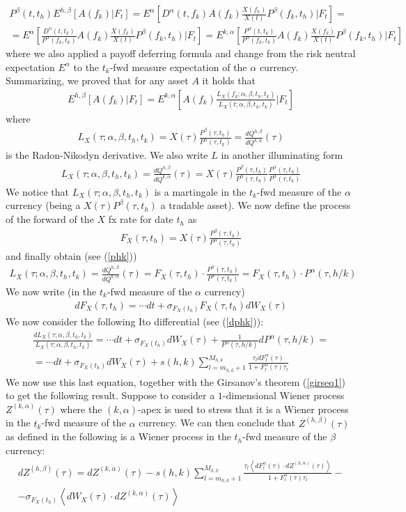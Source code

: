 \documentclass[a4paper,10pt]{report}
\theoremstyle{plain}
\theoremstyle{definition}
\newcommand\be{\begin{eqnarray}}    %
\newcommand\ee{\end{eqnarray}}
\begin{document}
\be 
P^{\beta}(t,t_h) E^{h, \beta}\left[A(f_k)| F_t\right] = E^{\alpha}\left[D^{\alpha}(t,f_k) A(f_k)  \frac{X(f_k)}{X(t)}  P^{\beta}(f_k,t_h) | F_t\right]=\\
=  E^{\alpha}\left[\frac{D^{\alpha}(t,t_k)}{P^{\alpha}(f_k,t_k)} A(f_k)  \frac{X(f_k)}{X(t)}  P^{\beta}(f_k,t_h) | F_t\right]
=E^{k, \alpha}\left[\frac{P^{\alpha}(t,t_k)}{P^{\alpha}(f_k,t_k)} A(f_k)  \frac{X(f_k)}{X(t)}  P^{\beta}(f_k,t_h) | F_t\right]
\ee
where we also applied a payoff deferring formula and change from the risk neutral expectation $E^{\alpha}$ to the $t_k$-fwd measure expectation of the $\alpha$ currency.
Summarizing, we proved that for any asset $A$ it holds that
\be 
E^{h, \beta}\left[A(f_k)| F_t\right] = E^{k, \alpha}\left[A(f_k) \frac{L_X (f_k; \alpha, \beta, t_h, t_k)}{L_X (t; \alpha, \beta, t_h, t_k)}| F_t\right]
\ee
where
\be 
L_X (\tau; \alpha, \beta, t_h, t_k) = X(\tau)\frac{P^{\beta}(\tau,t_h)}{P^{\alpha}(\tau,t_k)}=\frac{dQ^{h, \beta}}{dQ^{k, \alpha}}(\tau)
\ee
is the Radon-Nikodyn derivative.
We also write $L$ in another illuminating form
\be 
L_X (\tau; \alpha, \beta, t_h, t_k) =\frac{dQ^{h, \beta}}{dQ^{k, \alpha}}(\tau)=
X(\tau)\frac{P^{\beta}(\tau,t_h)}{P^{\alpha}(\tau,t_h)}\frac{P^{\alpha}(\tau,t_h)}{P^{\alpha}(\tau,t_k)}
\ee
We notice that $L_X (\tau; \alpha, \beta, t_h, t_k)$ is a martingale in the $t_k$-fwd measure of the $\alpha$ currency (being a $X(\tau)P^{\beta}(\tau,t_h)$ a tradable asset).
We now define the process of the forward of the $X$ fx rate for date $t_h$ as
\be 
F_X(\tau, t_h)=X(\tau)\frac{P^{\beta}(\tau,t_h)}{P^{\alpha}(\tau,t_h)}
\ee
and finally obtain (see (\ref{phk}))
\be 
L_X (\tau; \alpha, \beta, t_h, t_k) =\frac{dQ^{h, \beta}}{dQ^{k, \alpha}}(\tau)=
F_X(\tau, t_h)\cdot\frac{P^{\alpha}(\tau,t_h)}{P^{\alpha}(\tau,t_k)}=F_X(\tau, t_h)\cdot P^{\alpha}(\tau, h/k)
\label{chengecurrencyandtfwdradnyk}
\ee
We now write (in the $t_k$-fwd measure of the $\alpha$ currency)
\be 
d F_X(\tau, t_h) = \cdots dt +\sigma_{F_X(t_h)}  F_X(\tau, t_h)  dW_X(\tau)
\ee
We now consider the following Ito differential (see (\ref{dphk})):
\be 
\frac{d L_X (\tau; \alpha, \beta, t_h, t_k)}{ L_X (\tau; \alpha, \beta, t_h, t_k)}=\cdots dt+ \sigma_{F_X(t_h)}dW_X(\tau) + \frac{1}{P^{\alpha}(\tau, h/k)}d P^{\alpha}(\tau, h/k)=\\
= \cdots dt+ \sigma_{F_X(t_h)}dW_X(\tau) +s(h,k) \sum_{l=m_{h,k}+1}^{M_{h,k}} \frac{\tau_l  d F_l^{\alpha}(\tau)}{1 + F_l^{\alpha}(\tau)\tau_l } 
\ee
We now use this last equation, together with the Girsanov's theorem (\ref{girseq1}) to get the following result.
Suppose to consider a $1$-dimensional Wiener process $Z^{(k, \alpha)}(\tau)$ where the $(k, \alpha)$-apex is used to stress that it is a Wiener process in the $t_k$-fwd measure of the $\alpha$ currency. We can then conclude that $Z^{(h, \beta)}(\tau)$ as defined in the following is a Wiener process in the $t_h$-fwd measure of the $\beta$ currency:
\be 
dZ^{(h, \beta)}(\tau) = dZ^{(k, \alpha)}(\tau)- s(h,k) \sum_{l=m_{h,k}+1}^{M_{h,k}} \frac{\tau_l  \left<d F_l^{\alpha}(\tau)\cdot dZ^{(k, \alpha)}(\tau)\right>}{1 + F_l^{\alpha}(\tau)\tau_l } -\\
- \sigma_{F_X(t_h)} \left<dW_X(\tau)\cdot dZ^{(k, \alpha)}(\tau)\right>
\label{tfwdmeasurechangedet}
\ee
\end{document}
